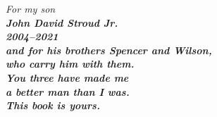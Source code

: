 
\thispagestyle{empty}
\vspace*{\fill}
\begin{center}
  \itshape
  For my son\\
  \upshape\bfseries John David Stroud Jr.\\
  \itshape 2004--2021\\[1.5em]
  and for his brothers Spencer and Wilson,\\
  who carry him with them.\\[1.5em]
  You three have made me\\
  a better man than I was.\\[1em]
  This book is yours.
\end{center}
\vspace*{\fill}
\clearpage

